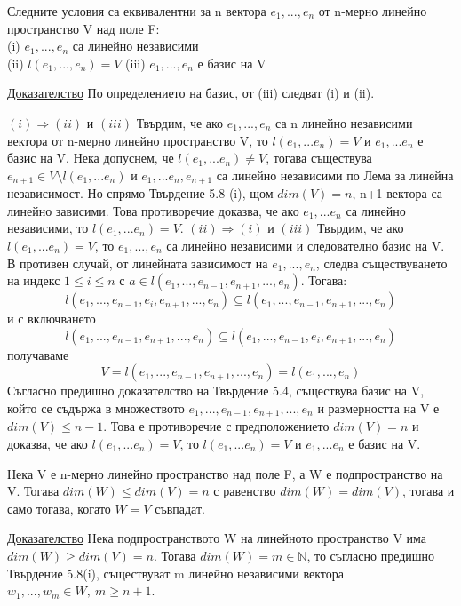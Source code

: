 \documentclass{article}
\begin{document}
\begin{tcolorbox}[title = Твърдение 5.9, colframe = blue!70!black, colback = blue!10!white]
    Следните условия са еквивалентни за n вектора $e_1,...,e_n$ от n-мерно линейно пространство V над поле F:\\
    (i) $e_1,...,e_n$ са линейно независими\\
    (ii) $l(e_1,...,e_n)=V$
    (iii) $e_1,...,e_n$ е базис на V
\end{tcolorbox}

\underline{Доказателство} По определението на базис, от (iii) следват (i) и (ii).


$(i) \Rightarrow (ii)$ и $(iii)$ Твърдим, че ако $e_1,...,e_n$ са n линейно независими вектора от
n-мерно линейно пространство V, то $l(e_1,...e_n)=V$ и $e_1,...e_n$ е базис на V. Нека допуснем,
че $l(e_1,...e_n)\neq V$, тогава съществува $e_{n+1}\in V\setminus l(e_1,...e_n)$ и $e_1,...e_n,e_{n+1}$ са линейно независими по Лема за линейна независимост.
Но спрямо Твърдение 5.8 (i), щом $dim(V)=n$, n+1 вектора са линейно зависими. Това противоречие доказва, че ако $e_1,...e_n$ са линейно независими, то $l(e_1,...e_n)=V$.
$(ii) \Rightarrow (i)$ и $(iii)$ Твърдим, че ако $l(e_1,...e_n)=V$, то $e_1,...,e_n$ са линейно независими и следователно базис на V.
В противен случай, от линейната зависимост на $e_1,...,e_n$, следва съществуването на индекс $1\leq i\leq n$ с $a\in l(e_1,...,e_{n-1},e_{n+1},...,e_n)$. Тогава:
\[
    l(e_1,...,e_{n-1},e_i,e_{n+1},...,e_n)\subseteq l(e_1,...,e_{n-1},e_{n+1},...,e_n)
\]
и с включването
\[
    l(e_1,...,e_{n-1},e_{n+1},...,e_n)\subseteq l(e_1,...,e_{n-1},e_i,e_{n+1},...,e_n)
\]
получаваме
\[
    V=l(e_1,...,e_{n-1},e_{n+1},...,e_n)= l(e_1,...,e_n)
\]
Съгласно предишно доказателство на Твърдение 5.4, съществува базис на V, който се съдържа в множеството ${e_1,...,e_{n-1},e_{n+1},...,e_n}$
и размерността на V е $dim(V)\leq n-1$. Това е противоречие с предположението $dim(V)=n$ и доказва, че ако $l(e_1,...e_n)=V$, то $l(e_1,...e_n)=V$ и $e_1,...e_n$ е базис на V.
\begin{tcolorbox}[title = Твърдение 5.10, colframe = blue!70!black, colback = blue!10!white]
    Нека V е n-мерно линейно пространство над поле F, а W е подпространство на V. Тогава $dim(W)\leq dim(V)=n$ с равенство $dim(W)=dim(V)$, тогава и само тогава, когато $W=V$ съвпадат.
\end{tcolorbox}
\underline{Доказателство} Нека подпространството W на линейното пространство V има $dim(W)\geq dim(V)=n$. Тогава $dim(W)=m\in \mathbb{N}$, то съгласно предишно Твърдение 5.8(i), съществуват m линейно независими вектора $w_1,...,w_m\in W, \ m\geq n+1$.
\end{document}
